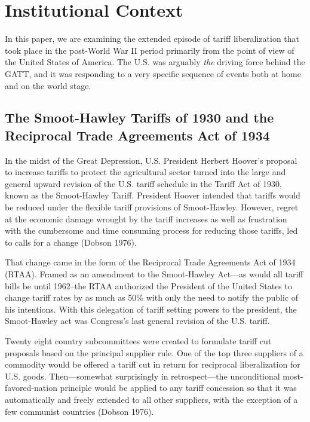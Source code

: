 \documentclass[
  12pt,
]{article}
\begin{document}
\hypertarget{institutional-context}{%
\section{Institutional Context}\label{institutional-context}}

In this paper, we are examining the extended episode of tariff liberalization that took place in the post-World War II period primarily from the point of view of the United States of America. The U.S. was arguably \emph{the} driving force behind the GATT, and it was responding to a very specific sequence of events both at home and on the world stage.

\hypertarget{the-smoot-hawley-tariffs-of-1930-and-the-reciprocal-trade-agreements-act-of-1934}{%
\subsection{The Smoot-Hawley Tariffs of 1930 and the Reciprocal Trade Agreements Act of 1934}\label{the-smoot-hawley-tariffs-of-1930-and-the-reciprocal-trade-agreements-act-of-1934}}

In the midst of the Great Depression, U.S. President Herbert Hoover's proposal to increase tariffs to protect the agricultural sector turned into the large and general upward revision of the U.S. tariff schedule in the Tariff Act of 1930, known as the Smoot-Hawley Tariff. President Hoover intended that tariffs would be reduced under the flexible tariff provisions of Smoot-Hawley. However, regret at the economic damage wrought by the tariff increases as well as frustration with the cumbersome and time consuming process for reducing those tariffs, led to calls for a change (Dobson 1976).

That change came in the form of the Reciprocal Trade Agreements Act of 1934 (RTAA). Framed as an amendment to the Smoot-Hawley Act---as would all tariff bills be until 1962--the RTAA authorized the President of the United States to change tariff rates by as much as 50\% with only the need to notify the public of his intentions. With this delegation of tariff setting powers to the president, the Smoot-Hawley act was Congress's last general revision of the U.S. tariff.

Twenty eight country subcommittees were created to formulate tariff cut proposals based on the principal supplier rule. One of the top three suppliers of a commodity would be offered a tariff cut in return for reciprocal liberalization for U.S. goods. Then---somewhat surprisingly in retrospect---the unconditional most-favored-nation principle would be applied to any tariff concession so that it was automatically and freely extended to all other suppliers, with the exception of a few communist countries (Dobson 1976).
\end{document}
